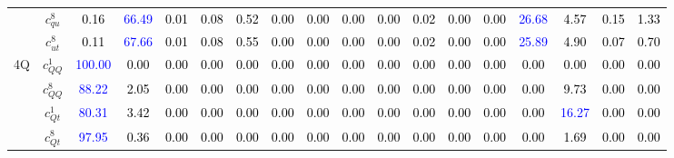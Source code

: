 \documentclass{article}
\begin{document}
\begin{landscape}
\begin{table}[H]
\begin{tabular}{|c|c|c|c|c|c|c|c|c|c|c|c|c|c|c|c|c|c|}
 & $c_{qu}^{8}$ & \textcolor{black}{0.16} & \textcolor{blue}{66.49} & \textcolor{black}{0.01} & \textcolor{black}{0.08} & \textcolor{black}{0.52} & \textcolor{black}{0.00} & \textcolor{black}{0.00} & \textcolor{black}{0.00} & \textcolor{black}{0.00} & \textcolor{black}{0.02} & \textcolor{black}{0.00} & \textcolor{black}{0.00} & \textcolor{blue}{26.68} & \textcolor{black}{4.57} & \textcolor{black}{0.15} & \textcolor{black}{1.33}\\ \cline{2-18}
 & $c_{ut}^{8}$ & \textcolor{black}{0.11} & \textcolor{blue}{67.66} & \textcolor{black}{0.01} & \textcolor{black}{0.08} & \textcolor{black}{0.55} & \textcolor{black}{0.00} & \textcolor{black}{0.00} & \textcolor{black}{0.00} & \textcolor{black}{0.00} & \textcolor{black}{0.02} & \textcolor{black}{0.00} & \textcolor{black}{0.00} & \textcolor{blue}{25.89} & \textcolor{black}{4.90} & \textcolor{black}{0.07} & \textcolor{black}{0.70}\\ \hline
\multirow{5}{*}{4Q}
 & $c_{QQ}^{1}$ & \textcolor{blue}{100.00} & \textcolor{black}{0.00} & \textcolor{black}{0.00} & \textcolor{black}{0.00} & \textcolor{black}{0.00} & \textcolor{black}{0.00} & \textcolor{black}{0.00} & \textcolor{black}{0.00} & \textcolor{black}{0.00} & \textcolor{black}{0.00} & \textcolor{black}{0.00} & \textcolor{black}{0.00} & \textcolor{black}{0.00} & \textcolor{black}{0.00} & \textcolor{black}{0.00} & \textcolor{black}{0.00}\\ \cline{2-18}
 & $c_{QQ}^{8}$ & \textcolor{blue}{88.22} & \textcolor{black}{2.05} & \textcolor{black}{0.00} & \textcolor{black}{0.00} & \textcolor{black}{0.00} & \textcolor{black}{0.00} & \textcolor{black}{0.00} & \textcolor{black}{0.00} & \textcolor{black}{0.00} & \textcolor{black}{0.00} & \textcolor{black}{0.00} & \textcolor{black}{0.00} & \textcolor{black}{0.00} & \textcolor{black}{9.73} & \textcolor{black}{0.00} & \textcolor{black}{0.00}\\ \cline{2-18}
 & $c_{Qt}^{1}$ & \textcolor{blue}{80.31} & \textcolor{black}{3.42} & \textcolor{black}{0.00} & \textcolor{black}{0.00} & \textcolor{black}{0.00} & \textcolor{black}{0.00} & \textcolor{black}{0.00} & \textcolor{black}{0.00} & \textcolor{black}{0.00} & \textcolor{black}{0.00} & \textcolor{black}{0.00} & \textcolor{black}{0.00} & \textcolor{black}{0.00} & \textcolor{blue}{16.27} & \textcolor{black}{0.00} & \textcolor{black}{0.00}\\ \cline{2-18}
 & $c_{Qt}^{8}$ & \textcolor{blue}{97.95} & \textcolor{black}{0.36} & \textcolor{black}{0.00} & \textcolor{black}{0.00} & \textcolor{black}{0.00} & \textcolor{black}{0.00} & \textcolor{black}{0.00} & \textcolor{black}{0.00} & \textcolor{black}{0.00} & \textcolor{black}{0.00} & \textcolor{black}{0.00} & \textcolor{black}{0.00} & \textcolor{black}{0.00} & \textcolor{black}{1.69} & \textcolor{black}{0.00} & \textcolor{black}{0.00}\\ \cline{2-18}

\end{tabular}
\end{table}
\end{landscape}
\end{document}
